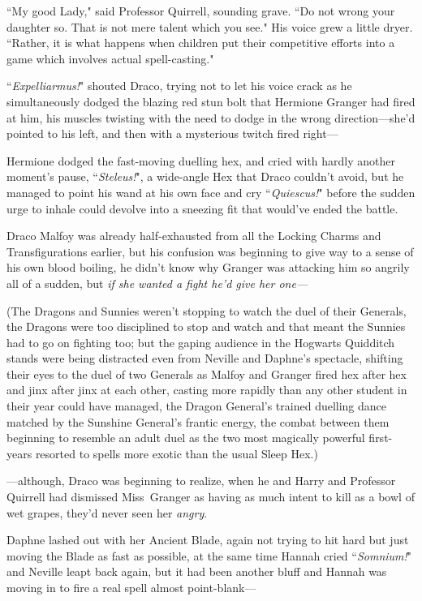 ``My good Lady," said Professor Quirrell, sounding grave. ``Do not wrong your daughter so. That is not mere talent which you see." His voice grew a little dryer. ``Rather, it is what happens when children put their competitive efforts into a game which involves actual spell-casting."

\later

``\emph{Expelliarmus!}" shouted Draco, trying not to let his voice crack as he simultaneously dodged the blazing red stun bolt that Hermione Granger had fired at him, his muscles twisting with the need to dodge in the wrong direction—she'd pointed to his left, and then with a mysterious twitch fired right—

Hermione dodged the fast-moving duelling hex, and cried with hardly another moment's pause, ``\emph{Steleus!}", a wide-angle Hex that Draco couldn't avoid, but he managed to point his wand at his own face and cry ``\emph{Quiescus!}" before the sudden urge to inhale could devolve into a sneezing fit that would've ended the battle.

Draco Malfoy was already half-exhausted from all the Locking Charms and Transfigurations earlier, but his confusion was beginning to give way to a sense of his own blood boiling, he didn't know why Granger was attacking him so angrily all of a sudden, but \emph{if she wanted a fight he'd give her one—}

(The Dragons and Sunnies weren't stopping to watch the duel of their Generals, the Dragons were too disciplined to stop and watch and that meant the Sunnies had to go on fighting too; but the gaping audience in the Hogwarts Quidditch stands were being distracted even from Neville and Daphne's spectacle, shifting their eyes to the duel of two Generals as Malfoy and Granger fired hex after hex and jinx after jinx at each other, casting more rapidly than any other student in their year could have managed, the Dragon General's trained duelling dance matched by the Sunshine General's frantic energy, the combat between them beginning to resemble an adult duel as the two most magically powerful first-years resorted to spells more exotic than the usual Sleep Hex.)

—although, Draco was beginning to realize, when he and Harry and Professor Quirrell had dismissed Miss~Granger as having as much intent to kill as a bowl of wet grapes, they'd never seen her \emph{angry}.

\later

Daphne lashed out with her Ancient Blade, again not trying to hit hard but just moving the Blade as fast as possible, at the same time Hannah cried ``\emph{Somnium!}" and Neville leapt back again, but it had been another bluff and Hannah was moving in to fire a real spell almost point-blank—

